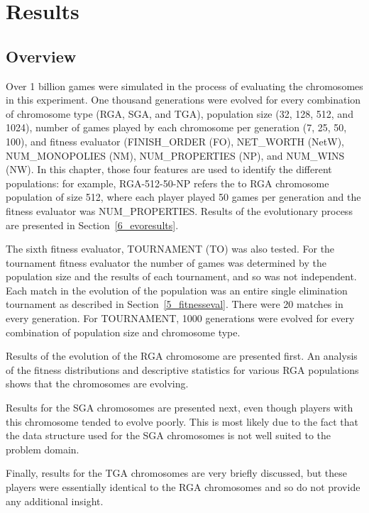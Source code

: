 \clearpage
\chapter{Results}\label{chap:results}

\section{Overview}

Over 1 billion games were simulated in the process of evaluating the chromosomes
in this experiment. One thousand generations were evolved for every combination
of chromosome type (RGA, SGA, and TGA), population size (32, 128, 512, and
1024), number of games played by each chromosome per generation (7, 25, 50,
100), and fitness evaluator (FINISH\_ORDER (FO), NET\_WORTH (NetW),
NUM\_MONOPOLIES (NM), NUM\_PROPERTIES (NP), and NUM\_WINS (NW). In this chapter,
those four features are used to identify the different populations: for example,
RGA-512-50-NP refers the to RGA chromosome population of size 512, where each
player played 50 games per generation and the fitness evaluator was
NUM\_PROPERTIES. Results of the evolutionary process are presented in
Section~\ref{6_evoresults}.

The sixth fitness evaluator, TOURNAMENT (TO) was also tested. For the tournament
fitness evaluator the number of games was determined by the population size and
the results of each tournament, and so was not independent. Each match in the
evolution of the population was an entire single elimination tournament as
described in Section~\ref{5_fitnesseval}. There were 20 matches in every
generation. For TOURNAMENT, 1000 generations were evolved for every combination
of population size and chromosome type.

Results of the evolution of the RGA chromosome are presented first. An analysis
of the fitness distributions and descriptive statistics for various RGA
populations shows that the chromosomes are evolving.

Results for the SGA chromosomes are presented next, even though players with
this chromosome tended to evolve poorly. This is most likely due to the fact
that the data structure used for the SGA chromosomes is not well suited to the
problem domain.

Finally, results for the TGA chromosomes are very briefly discussed, but these
players were essentially identical to the RGA chromosomes and so do not provide
any additional insight.

